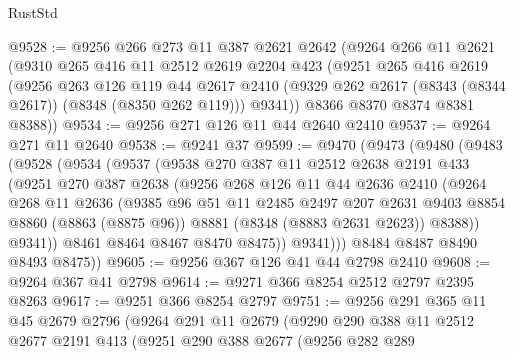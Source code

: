 \begin{lexlean}{RustStd}
\begin{coremodule}
{\begin{coremodule}
{{{{{{{{{{{{{{{{{{{{{{{{{{{{{{{{{{{{{{{{{{{{{{{{{{@9528 := @9256
    @266
    @273
    @11
    @387
    @2621
    @2642
    (@9264
      @266
      @11
      @2621
      (@9310
        @265
        @416
        @11
        @2512
        @2619
        @2204
        @423
        (@9251
          @265
          @416
          @2619
          (@9256
            @263
            @126
            @119
            @44
            @2617
            @2410
            (@9329 @262 @2617 (@8343 (@8344 @2617)) (@8348 (@8350 @262 @119)))
            @9341))
        @8366
        @8370
        @8374
        @8381
        @8388))
@9534 := @9256 @271 @126 @11 @44 @2640 @2410
@9537 := @9264 @271 @11 @2640
@9538 := @9241 @37
@9599 := @9470
    (@9473
      (@9480
        (@9483
          (@9528
            (@9534
              (@9537
                (@9538
                  @270
                  @387
                  @11
                  @2512
                  @2638
                  @2191
                  @433
                  (@9251
                    @270
                    @387
                    @2638
                    (@9256
                      @268
                      @126
                      @11
                      @44
                      @2636
                      @2410
                      (@9264
                        @268
                        @11
                        @2636
                        (@9385
                          @96
                          @51
                          @11
                          @2485
                          @2497
                          @207
                          @2631
                          @9403
                          @8854
                          @8860
                          (@8863 (@8875 @96))
                          @8881
                          (@8348 (@8883 @2631 @2623))
                          @8388))
                      @9341))
                  @8461
                  @8464
                  @8467
                  @8470
                  @8475))
              @9341)))
        @8484
        @8487
        @8490
        @8493
        @8475))
@9605 := @9256 @367 @126 @41 @44 @2798 @2410
@9608 := @9264 @367 @41 @2798
@9614 := @9271 @366 @8254 @2512 @2797 @2395 @8263
@9617 := @9251 @366 @8254 @2797
@9751 := @9256
    @291
    @365
    @11
    @45
    @2679
    @2796
    (@9264
      @291
      @11
      @2679
      (@9290
        @290
        @388
        @11
        @2512
        @2677
        @2191
        @413
        (@9251
          @290
          @388
          @2677
          (@9256
            @282
            @289
}}}}}}}}}}}}}}}}}}}}}}}}}}}}}}}}}}}}}}}}}}}}}}}}}}
\end{coremodule}}
\end{coremodule}
\end{lexlean}
